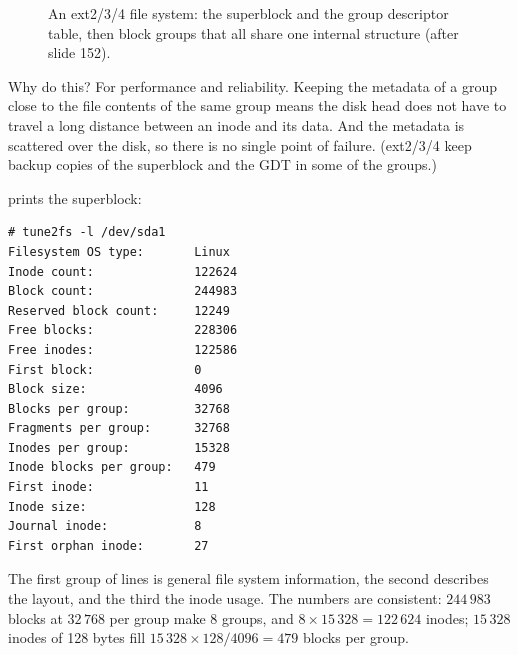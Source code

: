 \begin{figure}[H]
\centering
{}
\caption{An ext2/3/4 file system: the superblock and the group descriptor table, then block groups that all share one internal structure (after slide 152).}
\label{fig:blockgroups}
\end{figure}

Why do this? For performance and reliability. Keeping the metadata of a group close to the file contents of the same group means the disk head does not have to travel a long distance between an inode and its data. And the metadata is scattered over the disk, so there is no single point of failure. (ext2/3/4 keep backup copies of the superblock and the GDT in some of the groups.)

\begin{example}
   prints the superblock:
\begin{lstlisting}[style=sh]
# tune2fs -l /dev/sda1
Filesystem OS type:       Linux
Inode count:              122624
Block count:              244983
Reserved block count:     12249
Free blocks:              228306
Free inodes:              122586
First block:              0
Block size:               4096
Blocks per group:         32768
Fragments per group:      32768
Inodes per group:         15328
Inode blocks per group:   479
First inode:              11
Inode size:               128
Journal inode:            8
First orphan inode:       27
\end{lstlisting}
  The first group of lines is general file system information, the second describes the layout, and the third the inode usage. The numbers are consistent: $244\,983$ blocks at $32\,768$ per group make 8 groups, and $8 \times 15\,328 = 122\,624$ inodes; $15\,328$ inodes of 128 bytes fill $15\,328 \times 128 / 4096 = 479$ blocks per group.
\end{example}


